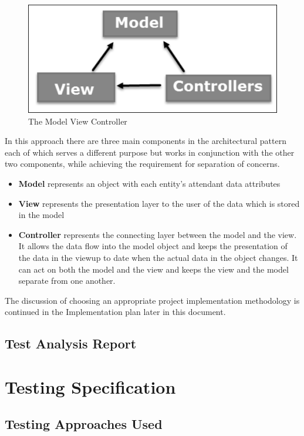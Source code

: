\documentclass[a4paper,12pt]{article}
\begin{document}
 \begin{figure}[h!]

\includegraphics{mvc.jpg}
  \caption{The Model View Controller}
  \label{fig:model view controller}
\end{figure}
In this approach there are three main components in the architectural pattern each of which serves a different purpose but works in conjunction with the other two components, while achieving the requirement for separation of concerns.

\begin{itemize}
\item \textbf{Model} represents an object with each entity's attendant data attributes 
\item \textbf{View} represents the presentation layer to the user of the data which is stored in the model
\item \textbf{Controller} represents the connecting layer between the model and the view. It allows the data flow into the model object and keeps the presentation of the data in the viewup to date when the actual data in the object changes. It can act on both the model and the view and keeps the view and the model separate from one another.
\end{itemize}

The discussion of choosing an appropriate project implementation methodology is continued in the Implementation plan later in this document.

\subsection {Test Analysis Report}

\section {Testing Specification}
\subsection {Testing Approaches Used}
\end{document}
